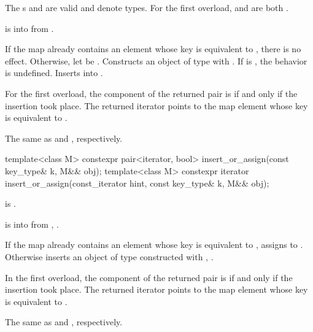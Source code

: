 \begin{itemdescr}
\pnum
\constraints
The s  and
 are valid and denote types.
For the first overload,
 and
 are both .

\pnum
\expects
{} is 
into  from
.

\pnum
\effects
If the map already contains an element whose key is equivalent to ,
there is no effect.
Otherwise, let  be .
Constructs an object  of type 
with .\newline
If  is ,
the behavior is undefined.
Inserts  into .

\pnum
\returns
For the first overload,
the  component of the returned pair is 
if and only if the insertion took place.
The returned iterator points to the map element
whose key is equivalent to .

\pnum
\complexity
The same as  and , respectively.
\end{itemdescr}

%
\begin{itemdecl}
template<class M>
  constexpr pair<iterator, bool> insert_or_assign(const key_type& k, M&& obj);
template<class M>
  constexpr iterator insert_or_assign(const_iterator hint, const key_type& k, M&& obj);
\end{itemdecl}

\begin{itemdescr}
\pnum
\mandates
{} is .

\pnum
\expects
{} is  into 
from , .

\pnum
\effects
If the map already contains an element 
whose key is equivalent to ,
assigns  to .
Otherwise inserts an object of type 
constructed with , .

\pnum
\returns
In the first overload,
the  component of the returned pair is 
if and only if the insertion took place.
The returned iterator points to the map element
whose key is equivalent to .

\pnum
\complexity
The same as  and ,
respectively.
\end{itemdescr}

